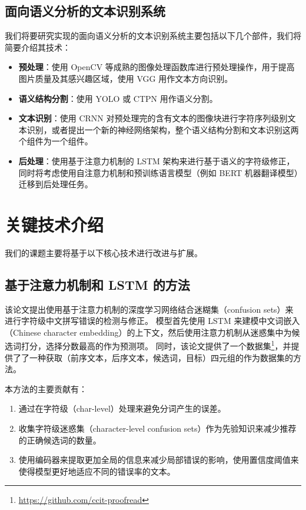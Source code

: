 \section{面向语义分析的文本识别系统}
我们将要研究实现的面向语义分析的文本识别系统主要包括以下几个部件，我们将简要介绍其技术：

\begin{itemize}
	\item \textbf{预处理}：使用 OpenCV 等成熟的图像处理函数库进行预处理操作，用于提高图片质量及其感兴趣区域，使用 VGG 用作文本方向识别。
	\item \textbf{语义结构分割}：使用 YOLO 或 CTPN 用作语义分割。
	\item \textbf{文本识别}：使用 CRNN 对预处理完的含有文本的图像块进行字符序列级别文本识别，或者提出一个新的神经网络架构，整个语义结构分割和文本识别这两个组件为一个组件。
	\item \textbf{后处理}：使用基于注意力机制的 LSTM 架构来进行基于语义的字符级修正，同时将考虑使用自注意力机制和预训练语言模型（例如 BERT 机器翻译模型）迁移到后处理任务。
\end{itemize}

\chapter{关键技术介绍}
我们的课题主要将基于以下核心技术进行改进与扩展。

\section{基于注意力机制和 LSTM 的方法}
\label{sec:lstm_based_postprocessing}
该论文提出使用基于注意力机制的深度学习网络结合迷糊集（confusion sets）来进行字符级中文拼写错误的检测与修正。
模型首先使用 LSTM 来建模中文词嵌入（Chinese character embedding）的上下文，然后使用注意力机制从迷惑集中为候选词打分，选择分数最高的作为预测项。
同时，该论文提供了一个数据集\footnote{\url{https://github.com/ccit-proofread}}，并提供了了一种获取（前序文本，后序文本，候选词，目标）四元组的作为数据集的方法。

本方法的主要贡献有：
\begin{enumerate}
	\item 通过在字符级（char-level）处理来避免分词产生的误差。
	\item 收集字符级迷惑集（character-level confusion sets）作为先验知识来减少推荐的正确候选词的数量。
	\item 使用编码器来提取更加全局的信息来减少局部错误的影响，使用置信度阈值来使得模型更好地适应不同的错误率的文本。
\end{enumerate}

